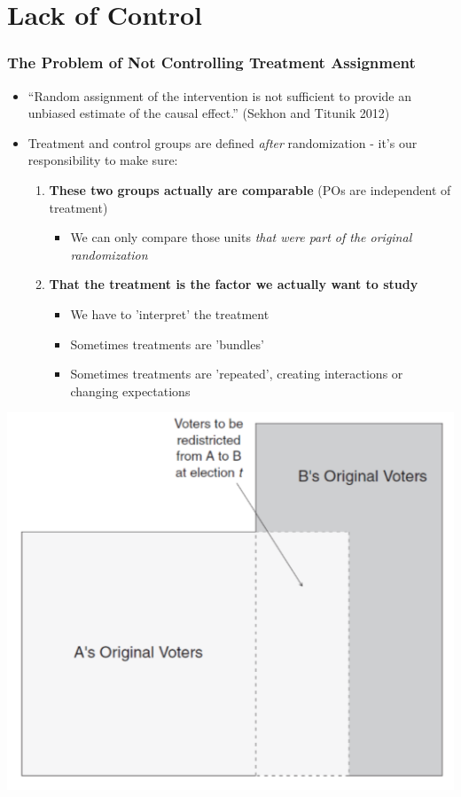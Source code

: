\documentclass[xcolor=x11names,compress]{beamer}\usepackage[]{graphicx}\usepackage[]{color}
\renewcommand{\(}{\begin{columns}}
\renewcommand{\)}{\end{columns}}
\newcommand{\<}[1]{\begin{column}{#1}}
\renewcommand{\>}{\end{column}}
\begin{document}
\section{Lack of Control}

\begin{frame}
\frametitle{The Problem of Not Controlling Treatment Assignment}
\begin{itemize}
\item ``Random assignment of the intervention is not sufficient to provide an unbiased estimate of the causal effect.'' (Sekhon and Titunik 2012)
\pause
\item Treatment and control groups are defined \textit{after} randomization - it's our responsibility to make sure:
\pause
\begin{enumerate}
\item \textbf{These two groups actually are comparable} (POs are independent of treatment)
\pause
\begin{itemize}
\item We can only compare those units \textit{that were part of the original randomization}
\end{itemize}
\pause
\item \textbf{That the treatment is the factor we actually want to study}
\pause
\begin{itemize}
\item We have to 'interpret' the treatment
\pause
\item Sometimes treatments are 'bundles'
\pause
\item Sometimes treatments are 'repeated', creating interactions or changing expectations
\end{itemize}
\end{enumerate}
\end{itemize}
\end{frame}

\begin{frame}
\includegraphics[scale=0.38]{Sekhon_redistricting_a.png}
\end{frame}
\end{document}
